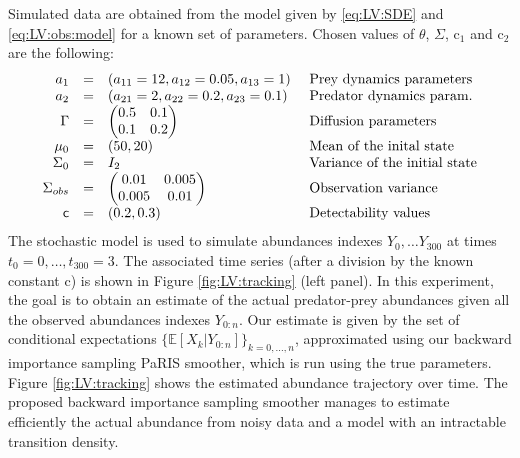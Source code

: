\documentclass[12pt]{article}
\def\pE{\mathbb{E}}
\begin{document}
Simulated data are obtained from the model given by \eqref{eq:LV:SDE} and \eqref{eq:LV:obs:model} for a known set of parameters.
 Chosen values of $\theta$, $\Sigma$, $\text{c}_1$ and $\text{c}_2$ are the following:
 \begin{align*}
\begin{array}{rcll}
a_1 &=& (a_{11} = 12, a_{12} = 0.05, a_{13} = 1) & \text{ Prey dynamics parameters}\\
a_2 &=& (a_{21} = 2, a_{22} =  0.2, a_{23} = 0.1) & \text{ Predator dynamics param.}\\
\Gamma &=&
\begin{pmatrix}
0.5 & 0.1\\
0.1 & 0.2
\end{pmatrix} & \text{ Diffusion parameters}\\
\mu_0 &=& (50,20) &\text{ Mean of the inital state}\\
\Sigma_0 &=& I_2 &\text{ Variance of the initial state}\\
\Sigma_{obs} &=&
\begin{pmatrix}
0.01& 0.005\\
 0.005& 0.01
\end{pmatrix}& \text{ Observation variance}\\
\sf{c} &=& (0.2, 0.3) & \text{ Detectability values}
\end{array}
\end{align*} 
The stochastic model is used to simulate abundances indexes $Y_0,\dots Y_{300}$ at times $t_0 = 0,\dots, t_{300} = 3$. 
The associated time series (after a division by the known constant $\text{c}$) is shown in Figure \ref{fig:LV:tracking} (left panel). 
In this experiment, the goal is to obtain an estimate of the actual predator-prey abundances given all the observed abundances indexes $Y_{0:n}$. 
Our estimate is given by the set of conditional expectations $\lbrace\pE[ X_k \vert Y_{0:n}]\rbrace_{k = 0,\dots, n}$, approximated using our backward importance sampling PaRIS smoother, which is run using the true parameters. 
Figure \ref{fig:LV:tracking} shows the estimated abundance trajectory over time. 
The proposed backward importance sampling smoother manages to estimate efficiently the actual abundance from noisy data and a model with an intractable transition density.
\end{document}
